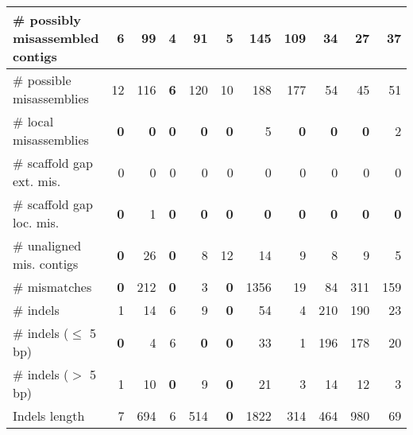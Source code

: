 \documentclass[12pt,a4paper]{article}
\begin{document}
\begin{table}[ht]
\begin{center}
\begin{tabular}{|l*{10}{|r}|}
\# possibly misassembled contigs & 6 & 99 & {\bf 4} & 91 & 5 & 145 & 109 & 34 & 27 & 37 \\ \hline
\hspace{5mm}\# possible misassemblies & 12 & 116 & {\bf 6} & 120 & 10 & 188 & 177 & 54 & 45 & 51 \\ \hline
\# local misassemblies & {\bf 0} & {\bf 0} & {\bf 0} & {\bf 0} & {\bf 0} & 5 & {\bf 0} & {\bf 0} & {\bf 0} & 2 \\ \hline
\# scaffold gap ext. mis. & 0 & 0 & 0 & 0 & 0 & 0 & 0 & 0 & 0 & 0 \\ \hline
\# scaffold gap loc. mis. & {\bf 0} & 1 & {\bf 0} & {\bf 0} & {\bf 0} & {\bf 0} & {\bf 0} & {\bf 0} & {\bf 0} & {\bf 0} \\ \hline
\# unaligned mis. contigs & {\bf 0} & 26 & {\bf 0} & 8 & 12 & 14 & 9 & 8 & 9 & 5 \\ \hline
\# mismatches & {\bf 0} & 212 & {\bf 0} & 3 & {\bf 0} & 1356 & 19 & 84 & 311 & 159 \\ \hline
\# indels & 1 & 14 & 6 & 9 & {\bf 0} & 54 & 4 & 210 & 190 & 23 \\ \hline
\hspace{5mm}\# indels ($\leq$ 5 bp) & {\bf 0} & 4 & 6 & {\bf 0} & {\bf 0} & 33 & 1 & 196 & 178 & 20 \\ \hline
\hspace{5mm}\# indels ($>$ 5 bp) & 1 & 10 & {\bf 0} & 9 & {\bf 0} & 21 & 3 & 14 & 12 & 3 \\ \hline
Indels length & 7 & 694 & 6 & 514 & {\bf 0} & 1822 & 314 & 464 & 980 & 69 \\ \hline
\end{tabular}
\end{center}
\end{table}
\end{document}
